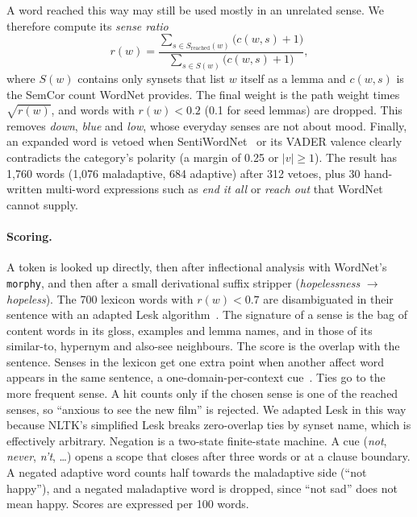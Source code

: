 \documentclass[runningheads]{llncs}
\begin{document}
A word reached this way may still be used mostly in an unrelated sense. We therefore compute its \emph{sense ratio}
\begin{equation}
r(w) = \frac{\sum_{s \in S_{\text{reached}}(w)} \big(c(w,s)+1\big)}{\sum_{s \in S(w)} \big(c(w,s)+1\big)},
\end{equation}
where $S(w)$ contains only synsets that list $w$ itself as a lemma and $c(w,s)$ is the SemCor count WordNet provides. The final weight is the path weight times $\sqrt{r(w)}$, and words with $r(w) < 0.2$ (0.1 for seed lemmas) are dropped. This removes \emph{down}, \emph{blue} and \emph{low}, whose everyday senses are not about mood. Finally, an expanded word is vetoed when SentiWordNet~\cite{esuli2006sentiwordnet} or its VADER valence clearly contradicts the category's polarity (a margin of 0.25 or $|v| \ge 1$). The result has 1,760 words (1,076 maladaptive, 684 adaptive) after 312 vetoes, plus 30 hand-written multi-word expressions such as \emph{end it all} or \emph{reach out} that WordNet cannot supply.

\paragraph{Scoring.}
A token is looked up directly, then after inflectional analysis with WordNet's \texttt{morphy}, and then after a small derivational suffix stripper (\emph{hopelessness} $\rightarrow$ \emph{hopeless}). The 700 lexicon words with $r(w) < 0.7$ are disambiguated in their sentence with an adapted Lesk algorithm~\cite{banerjee2002adapted}. The signature of a sense is the bag of content words in its gloss, examples and lemma names, and in those of its similar-to, hypernym and also-see neighbours. The score is the overlap with the sentence. Senses in the lexicon get one extra point when another affect word appears in the same sentence, a one-domain-per-context cue~\cite{magnini2002role}. Ties go to the more frequent sense. A hit counts only if the chosen sense is one of the reached senses, so ``anxious to see the new film'' is rejected. We adapted Lesk in this way because NLTK's simplified Lesk breaks zero-overlap ties by synset name, which is effectively arbitrary. Negation is a two-state finite-state machine. A cue (\emph{not}, \emph{never}, \emph{n't}, \dots) opens a scope that closes after three words or at a clause boundary. A negated adaptive word counts half towards the maladaptive side (``not happy''), and a negated maladaptive word is dropped, since ``not sad'' does not mean happy. Scores are expressed per 100 words.
\end{document}

